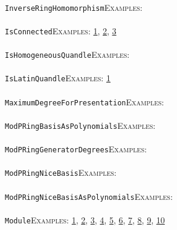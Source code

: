 \documentclass[a4paper,11pt]{report}
\begin{document}
{{ \\
 \texttt{InverseRingHomomorphism}{\nobreakspace}{\nobreakspace}{\nobreakspace}{\nobreakspace}\textsc{Examples:} \\
 \\
 \texttt{IsConnected}{\nobreakspace}{\nobreakspace}{\nobreakspace}{\nobreakspace}\textsc{Examples:} \href{../www/SideLinks/About/aboutQuandles2.html} {1}{\nobreakspace}, \href{../www/SideLinks/About/aboutQuandles.html} {2}{\nobreakspace}, \href{../www/SideLinks/About/aboutKnotsQuandles.html} {3}{\nobreakspace} \\
 \\
 \texttt{IsHomogeneousQuandle}{\nobreakspace}{\nobreakspace}{\nobreakspace}{\nobreakspace}\textsc{Examples:} \\
 \\
 \texttt{IsLatinQuandle}{\nobreakspace}{\nobreakspace}{\nobreakspace}{\nobreakspace}\textsc{Examples:} \href{../www/SideLinks/About/aboutQuandles.html} {1}{\nobreakspace} \\
 \\
 \texttt{MaximumDegreeForPresentation}{\nobreakspace}{\nobreakspace}{\nobreakspace}{\nobreakspace}\textsc{Examples:} \\
 \\
 \texttt{ModPRingBasisAsPolynomials}{\nobreakspace}{\nobreakspace}{\nobreakspace}{\nobreakspace}\textsc{Examples:} \\
 \\
 \texttt{ModPRingGeneratorDegrees}{\nobreakspace}{\nobreakspace}{\nobreakspace}{\nobreakspace}\textsc{Examples:} \\
 \\
 \texttt{ModPRingNiceBasis}{\nobreakspace}{\nobreakspace}{\nobreakspace}{\nobreakspace}\textsc{Examples:} \\
 \\
 \texttt{ModPRingNiceBasisAsPolynomials}{\nobreakspace}{\nobreakspace}{\nobreakspace}{\nobreakspace}\textsc{Examples:} \\
 \\
 \texttt{Module}{\nobreakspace}{\nobreakspace}{\nobreakspace}{\nobreakspace}\textsc{Examples:} \href{tutorial/chap10.html} {1}{\nobreakspace}, \href{../www/SideLinks/About/aboutAbelianCategories.html} {2}{\nobreakspace}, \href{../www/SideLinks/About/aboutNonabelian.html} {3}{\nobreakspace}, \href{../www/SideLinks/About/aboutPeriodic.html} {4}{\nobreakspace}, \href{../www/SideLinks/About/aboutCoefficientSequence.html} {5}{\nobreakspace}, \href{../www/SideLinks/About/aboutCrossedMods.html} {6}{\nobreakspace}, \href{../www/SideLinks/About/aboutGouter.html} {7}{\nobreakspace}, \href{../www/SideLinks/About/aboutIntro.html} {8}{\nobreakspace}, \href{../www/SideLinks/About/aboutTorAndExt.html} {9}{\nobreakspace}, \href{../www/SideLinks/About/aboutTwistedCoefficients.html} {10}{\nobreakspace} \\
}}
\end{document}

